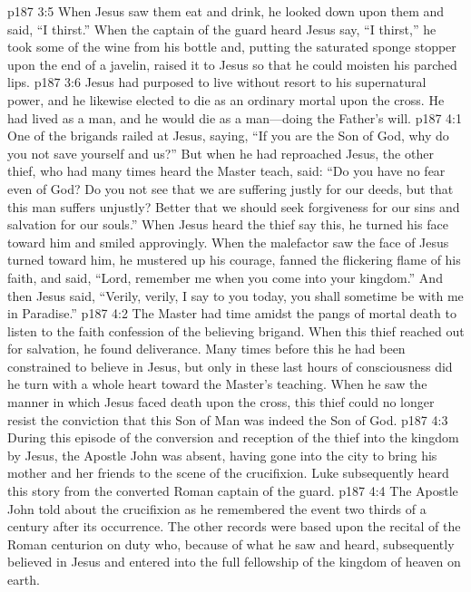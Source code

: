 \vs p187 3:5 When Jesus saw them eat and drink, he looked down upon them and said, \textcolor{ubdarkred}{“I thirst.”} When the captain of the guard heard Jesus say, “I thirst,” he took some of the wine from his bottle and, putting the saturated sponge stopper upon the end of a javelin, raised it to Jesus so that he could moisten his parched lips.
\vs p187 3:6 Jesus had purposed to live without resort to his supernatural power, and he likewise elected to die as an ordinary mortal upon the cross. He had lived as a man, and he would die as a man---doing the Father’s will.
\vs p187 4:1 One of the brigands railed at Jesus, saying, “If you are the Son of God, why do you not save yourself and us?” But when he had reproached Jesus, the other thief, who had many times heard the Master teach, said: “Do you have no fear even of God? Do you not see that we are suffering justly for our deeds, but that this man suffers unjustly? Better that we should seek forgiveness for our sins and salvation for our souls.” When Jesus heard the thief say this, he turned his face toward him and smiled approvingly. When the malefactor saw the face of Jesus turned toward him, he mustered up his courage, fanned the flickering flame of his faith, and said, “Lord, remember me when you come into your kingdom.” And then Jesus said, \textcolor{ubdarkred}{“Verily, verily, I say to you today, you shall sometime be with me in Paradise.”}
\vs p187 4:2 The Master had time amidst the pangs of mortal death to listen to the faith confession of the believing brigand. When this thief reached out for salvation, he found deliverance. Many times before this he had been constrained to believe in Jesus, but only in these last hours of consciousness did he turn with a whole heart toward the Master’s teaching. When he saw the manner in which Jesus faced death upon the cross, this thief could no longer resist the conviction that this Son of Man was indeed the Son of God.
\pc \vs p187 4:3 During this episode of the conversion and reception of the thief into the kingdom by Jesus, the Apostle John was absent, having gone into the city to bring his mother and her friends to the scene of the crucifixion. Luke subsequently heard this story from the converted Roman captain of the guard.
\vs p187 4:4 The Apostle John told about the crucifixion as he remembered the event two thirds of a century after its occurrence. The other records were based upon the recital of the Roman centurion on duty who, because of what he saw and heard, subsequently believed in Jesus and entered into the full fellowship of the kingdom of heaven on earth.

